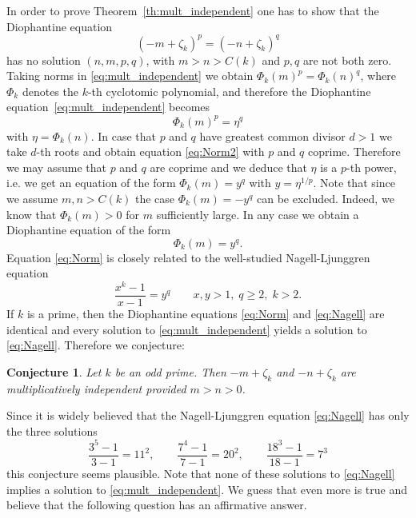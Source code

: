 \documentclass{amsart}
\theoremstyle{plain}
\numberwithin{equation}{section}
\newtheorem{conjecture}[thm]{Conjecture}
\theoremstyle{remark}
\begin{document}
In order to prove Theorem~\ref{th:mult_independent} one has to show
that the Diophantine equation
\begin{equation}\label{eq:mult_independent}
(-m+\zeta_k)^p=(-n+\zeta_k)^q
\end{equation}
has no solution $(n,m,p,q)$, with $m>n>C(k)$ and $p,q$ are not both
zero. Taking norms in \eqref{eq:mult_independent} we obtain
$\Phi_k(m)^p=\Phi_k(n)^q$, where $\Phi_k$ denotes the $k$-th
cyclotomic polynomial, and therefore the Diophantine
equation~\eqref{eq:mult_independent} becomes
\begin{equation}\label{eq:Norm2}
\Phi_k(m)^p=\eta^q
\end{equation}
with $\eta=\Phi_k(n)$. In case that $p$ and $q$ have
greatest common divisor $d>1$ we take $d$-th roots and obtain equation
\eqref{eq:Norm2} with $p$ and $q$ coprime. Therefore we may assume
that $p$ and $q$ are coprime and we deduce that
$\eta$ is a $p$-th power, i.e.  we get an equation of the form
$\Phi_k(m)=y^q$ with $y=\eta^{1/p}$.   Note that since we assume
$m,n>C(k)$ the case $\Phi_k(m)=-y^q$ can be excluded. Indeed, we know
that $\Phi_k(m)>0$ for $m$ sufficiently large. In any case we obtain a
Diophantine equation of the form
\begin{equation}\label{eq:Norm}
\Phi_k(m)=y^q.
\end{equation}
Equation \eqref{eq:Norm} is closely related to the well-studied Nagell-Ljunggren equation
\begin{equation}\label{eq:Nagell}
\frac{x^k-1}{x-1}=y^q\qquad x,y>1,\; q\geq 2, \; k>2.
\end{equation}
If $k$ is a prime, then the Diophantine equations \eqref{eq:Norm} and \eqref{eq:Nagell} are identical and every solution to \eqref{eq:mult_independent} yields 
a solution to \eqref{eq:Nagell}. Therefore we conjecture: 

\begin{conjecture}
Let $k$ be an odd prime. Then $-m+\zeta_k$ and $-n+\zeta_k$ are multiplicatively independent provided $m>n>0$.
\end{conjecture}

Since it is widely believed that the Nagell-Ljunggren equation \eqref{eq:Nagell} has only the three solutions
\[\frac{3^5-1}{3-1}=11^2,\qquad \frac{7^4-1}{7-1}=20^2, \qquad \frac{18^3-1}{18-1}=7^3\]
this conjecture seems plausible. Note that none of these solutions to \eqref{eq:Nagell} implies a solution to \eqref{eq:mult_independent}. We guess that even 
more 
is true and believe that the following question has an affirmative answer.
\end{document}
